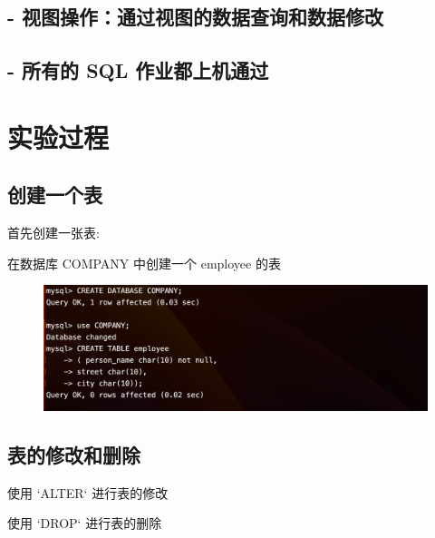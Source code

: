 \documentclass{article}
\begin{document}
    \subsection*{- 视图操作：通过视图的数据查询和数据修改}
    \subsection*{- 所有的 SQL 作业都上机通过}


\section{实验过程}

\subsection*{创建一个表}

首先创建一张表:

在数据库 COMPANY 中创建一个 employee 的表

\begin{figure}[H]
    \centering
    \includegraphics[width=1\textwidth]{lab2/1.png}
    \end{figure}


\subsection*{表的修改和删除}

使用 `ALTER` 进行表的修改

使用 `DROP` 进行表的删除
\end{document}
